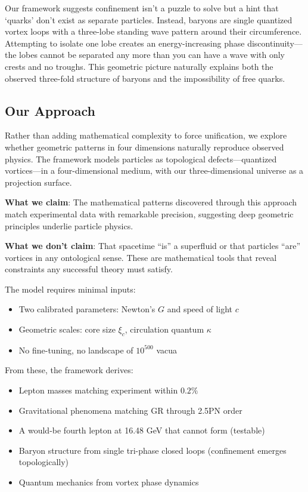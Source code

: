 Our framework suggests confinement isn't a puzzle to solve but a hint that `quarks' don't exist as separate particles. Instead, baryons are single quantized vortex loops with a three-lobe standing wave pattern around their circumference. Attempting to isolate one lobe creates an energy-increasing phase discontinuity---the lobes cannot be separated any more than you can have a wave with only crests and no troughs. This geometric picture naturally explains both the observed three-fold structure of baryons and the impossibility of free quarks.

\subsection{Our Approach}

Rather than adding mathematical complexity to force unification, we explore whether geometric patterns in four dimensions naturally reproduce observed physics. The framework models particles as topological defects---quantized vortices---in a four-dimensional medium, with our three-dimensional universe as a projection surface.

\textbf{What we claim}: The mathematical patterns discovered through this approach match experimental data with remarkable precision, suggesting deep geometric principles underlie particle physics.

\textbf{What we don't claim}: That spacetime ``is'' a superfluid or that particles ``are'' vortices in any ontological sense. These are mathematical tools that reveal constraints any successful theory must satisfy.

The model requires minimal inputs:
\begin{itemize}
\item Two calibrated parameters: Newton's $G$ and speed of light $c$
\item Geometric scales: core size $\xi_c$, circulation quantum $\kappa$
\item No fine-tuning, no landscape of $10^{500}$ vacua
\end{itemize}

From these, the framework derives:
\begin{itemize}
\item Lepton masses matching experiment within $0.2\%$
\item Gravitational phenomena matching GR through 2.5PN order
\item A would-be fourth lepton at 16.48 GeV that cannot form (testable)
\item Baryon structure from single tri-phase closed loops (confinement emerges topologically)
\item Quantum mechanics from vortex phase dynamics
\end{itemize}

